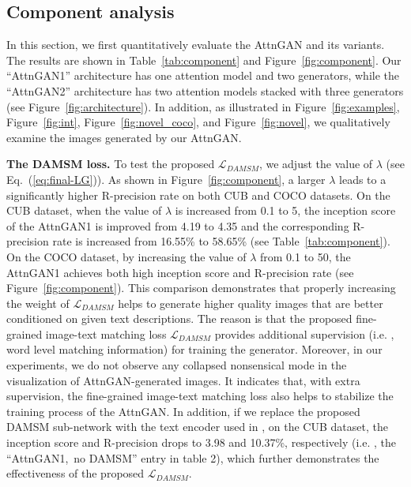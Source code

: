 \subsection{Component analysis} \label{sec:component}

In this section, we first quantitatively evaluate the AttnGAN and its variants.  The results are shown in Table~\ref{tab:component} and Figure~\ref{fig:component}. Our ``AttnGAN1'' architecture has one attention model and two generators, while the ``AttnGAN2'' architecture has two attention models stacked with three generators (see Figure~\ref{fig:architecture}). In addition, as illustrated in Figure~\ref{fig:examples}, Figure~\ref{fig:int}, Figure~\ref{fig:novel_coco}, and Figure~\ref{fig:novel}, we qualitatively examine the images generated by our AttnGAN. 

\textbf{The DAMSM loss. }{ To test the proposed $\mathcal{L}_{DAMSM}$, we adjust the value of $\lambda$ (see Eq.~(\ref{eq:final-LG})).
As shown in Figure~\ref{fig:component}, a larger $\lambda$ leads to a significantly higher R-precision rate on both CUB and COCO datasets. On the CUB dataset, when the value of $\lambda$ is increased from 0.1 to 5, the inception score of the AttnGAN1 is improved from 4.19 to 4.35 and the corresponding R-precision rate is increased from 16.55\% to 58.65\% (see Table~\ref{tab:component}). On the COCO dataset, by increasing the value of $\lambda$ from 0.1 to 50, the AttnGAN1 achieves both high inception score and R-precision rate  (see Figure~\ref{fig:component}). This comparison demonstrates that properly increasing the weight of $\mathcal{L}_{DAMSM}$ helps to generate higher quality images that are better conditioned on given text descriptions. The reason is that the proposed fine-grained image-text matching loss $\mathcal{L}_{DAMSM}$ provides additional supervision (i.e. , word level matching information) for training the generator. Moreover, in our experiments, we do not observe any collapsed nonsensical mode in the visualization of AttnGAN-generated images. It indicates that, with extra supervision, the fine-grained image-text matching loss also helps to stabilize the training process of the AttnGAN. In addition, if we replace the proposed DAMSM sub-network with the text encoder used in \cite{reed2016cvpr}, on the CUB dataset, the inception score and R-precision drops to 3.98 and 10.37\%, respectively (i.e. , the ``AttnGAN1,~no DAMSM'' entry in table 2), which further demonstrates the effectiveness of the proposed $\mathcal{L}_{DAMSM}$. 
}


